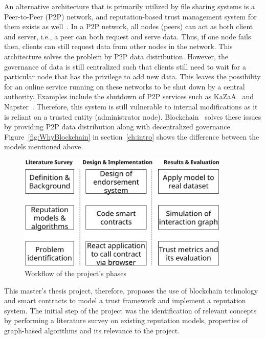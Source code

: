 An alternative architecture that is primarily utilized by file sharing systems
is a Peer-to-Peer (P2P) network, and reputation-based trust management system
for them exists as well~\cite{selcuk2004reputation}. In a P2P network, all
nodes (peers) can act as both client and server, i.e., a peer can both request
and serve data. Thus, if one node fails then, clients can still request data
from other nodes in the network. This architecture solves the problem by P2P
data distribution. However, the governance of data is still centralized such
that clients still need to wait for a particular node that has the privilege to
add new data. This leaves the possibility for an online service running on
these networks to be shut down by a central authority. Examples include the
shutdown of P2P services such as KaZaA~\cite{mlcakova2004configuring} and
Napster~\cite{stern2000napster}. Therefore, this system is still vulnerable to
internal modifications as it is reliant on a trusted entity (administrator
node). Blockchain~\cite{atzori2015blockchain} solves these issues by providing
P2P data distribution along with decentralized governance.
Figure~\ref{fig:WhyBlockchain} in section~\ref{ch:intro} shows the difference
between the models mentioned above. \par
\begin{figure}
	\begin{center}
		\includegraphics[width=0.9\textwidth]{Images/workflow.eps}
		\caption{Workflow of the project's phases}
		\label{fig:thesisSteps}
	\end{center}
\end{figure}
This master's thesis project, therefore, proposes the use of blockchain
technology and smart contracts to model a trust framework and implement a
reputation system. The initial step of the project was the identification of
relevant concepts by performing a literature survey on existing reputation
models, properties of graph-based algorithms and its relevance to the project.
